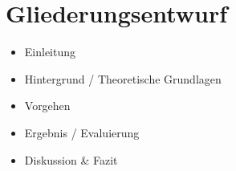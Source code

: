 \section{Gliederungsentwurf}

\begin{itemize}
	\item Einleitung
	\item Hintergrund / Theoretische Grundlagen
	\item Vorgehen
	\item Ergebnis / Evaluierung
	\item Diskussion \& Fazit
\end{itemize}
